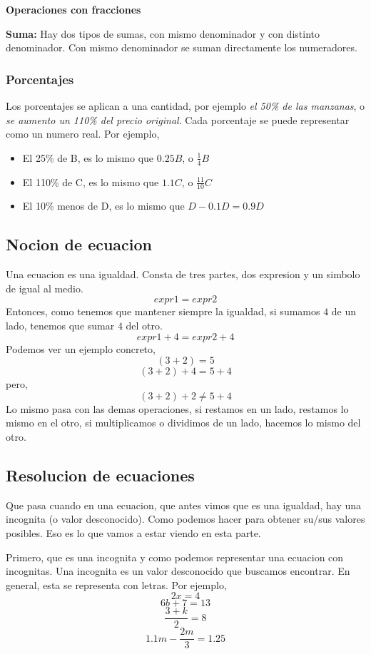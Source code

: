 \documentclass{article}
\begin{document}
\begin{normalsize}
\begin{center}
\textbf{Operaciones con fracciones}
\end{center}
\end{normalsize}

\begin{small}
\textbf{Suma:} Hay dos tipos de sumas, con mismo denominador y con distinto denominador.
Con mismo denominador se suman directamente los numeradores.
\end{small}

\subsubsection*{Porcentajes}
\begin{small}
Los porcentajes se aplican a una cantidad, por ejemplo \textit{el 50\% de las manzanas}, o \textit{se aumento un 110\% del precio original}.
Cada porcentaje se puede representar como un numero real.
Por ejemplo,
\begin{itemize}
	\item El 25\% de B, es lo mismo que $0.25B$, o $\frac{1}{4}B$
	\item El 110\% de C, es lo mismo que $1.1C$, o $\frac{11}{10}C$
	\item El 10\% menos de D, es lo mismo que $D-0.1D=0.9D$
\end{itemize}
\end{small}

\subsection{Nocion de ecuacion}
\begin{small}
Una ecuacion es una igualdad. Consta de tres partes, dos expresion y un simbolo de igual al medio.
\[expr1=expr2\]
Entonces, como tenemos que mantener siempre la igualdad, si sumamos $4$ de un lado, tenemos que sumar $4$ del otro.
\[expr1+4=expr2+4\]
Podemos ver un ejemplo concreto,
\[(3+2)=5\]
\[(3+2)+4=5+4\]
pero,
\[(3+2)+2\neq5+4\]
Lo mismo pasa con las demas operaciones, si restamos en un lado, restamos lo mismo en el otro, si multiplicamos o dividimos de un lado, hacemos lo mismo del otro.
\end{small}

\subsection{Resolucion de ecuaciones}
\begin{small}
Que pasa cuando en una ecuacion, que antes vimos que es una igualdad, hay una incognita (o valor desconocido). Como podemos hacer para obtener su/sus valores posibles. Eso es lo que vamos a estar viendo en esta parte.

Primero, que es una incognita y como podemos representar una ecuacion con incognitas. Una incognita es un valor desconocido que buscamos encontrar. En general, esta se representa con letras. Por ejemplo, 
\[2x=4\]
\[6b+7=13\]
\[\frac{3+k}{2}=8\]
\[1.1m-\frac{2m}{3}=1.25\]
\end{small}
\end{document}
